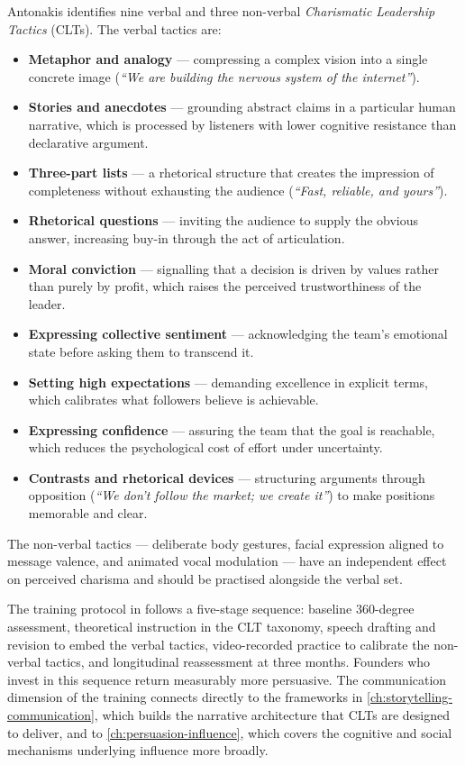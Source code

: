 Antonakis identifies nine verbal and three non-verbal \emph{Charismatic Leadership Tactics}
(CLTs). The verbal tactics are:
\begin{itemize}
  \item \textbf{Metaphor and analogy} --- compressing a complex vision into a single concrete
    image (\emph{``We are building the nervous system of the internet''}).
  \item \textbf{Stories and anecdotes} --- grounding abstract claims in a particular human
    narrative, which is processed by listeners with lower cognitive resistance than declarative
    argument.
  \item \textbf{Three-part lists} --- a rhetorical structure that creates the impression of
    completeness without exhausting the audience (\emph{``Fast, reliable, and yours''}).
  \item \textbf{Rhetorical questions} --- inviting the audience to supply the obvious answer,
    increasing buy-in through the act of articulation.
  \item \textbf{Moral conviction} --- signalling that a decision is driven by values rather than
    purely by profit, which raises the perceived trustworthiness of the leader.
  \item \textbf{Expressing collective sentiment} --- acknowledging the team's emotional state
    before asking them to transcend it.
  \item \textbf{Setting high expectations} --- demanding excellence in explicit terms, which
    calibrates what followers believe is achievable.
  \item \textbf{Expressing confidence} --- assuring the team that the goal is reachable,
    which reduces the psychological cost of effort under uncertainty.
  \item \textbf{Contrasts and rhetorical devices} --- structuring arguments through opposition
    (\emph{``We don't follow the market; we create it''}) to make positions memorable and clear.
\end{itemize}
The non-verbal tactics --- deliberate body gestures, facial expression aligned to message
valence, and animated vocal modulation --- have an independent effect on perceived charisma and
should be practised alongside the verbal set.

The training protocol in \textcite{antonakis2011charisma} follows a five-stage sequence:
baseline 360-degree assessment, theoretical instruction in the CLT taxonomy, speech drafting
and revision to embed the verbal tactics, video-recorded practice to calibrate the non-verbal
tactics, and longitudinal reassessment at three months. Founders who invest in this sequence
return measurably more persuasive. The communication dimension of the training connects directly
to the frameworks in \cref{ch:storytelling-communication}, which builds the narrative
architecture that CLTs are designed to deliver, and to \cref{ch:persuasion-influence}, which
covers the cognitive and social mechanisms underlying influence more broadly.

